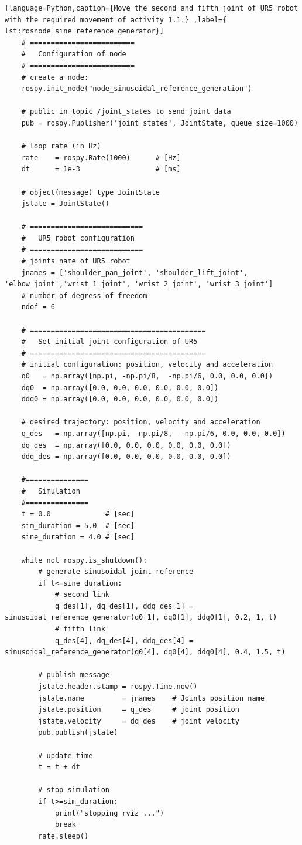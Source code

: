 \begin{lstlisting}[language=Python,caption={Move the second and fifth joint of UR5 robot with the required movement of activity 1.1.} ,label={ lst:rosnode_sine_reference_generator}]
    # =========================
    #   Configuration of node
    # =========================
    # create a node: 
    rospy.init_node("node_sinusoidal_reference_generation")
    
    # public in topic /joint_states	to send joint data	
    pub = rospy.Publisher('joint_states', JointState, queue_size=1000)
    
    # loop rate (in Hz)
    rate 	= rospy.Rate(1000)		# [Hz]
    dt 		= 1e-3					# [ms]
    
    # object(message) type JointState
    jstate = JointState()
    
    # ===========================
    #   UR5 robot configuration
    # ===========================
    # joints name of UR5 robot
    jnames = ['shoulder_pan_joint', 'shoulder_lift_joint', 'elbow_joint','wrist_1_joint', 'wrist_2_joint', 'wrist_3_joint']
    # number of degress of freedom
    ndof = 6
    
    # ==========================================
    #   Set initial joint configuration of UR5
    # ==========================================
    # initial configuration: position, velocity and acceleration 
    q0   = np.array([np.pi, -np.pi/8,  -np.pi/6, 0.0, 0.0, 0.0])
    dq0  = np.array([0.0, 0.0, 0.0, 0.0, 0.0, 0.0])
    ddq0 = np.array([0.0, 0.0, 0.0, 0.0, 0.0, 0.0]) 
    
    # desired trajectory: position, velocity and acceleration
    q_des   = np.array([np.pi, -np.pi/8,  -np.pi/6, 0.0, 0.0, 0.0]) 
    dq_des  = np.array([0.0, 0.0, 0.0, 0.0, 0.0, 0.0]) 
    ddq_des = np.array([0.0, 0.0, 0.0, 0.0, 0.0, 0.0]) 
    
    #===============
    #   Simulation
    #===============
    t = 0.0             # [sec] 
    sim_duration = 5.0  # [sec]
    sine_duration = 4.0 # [sec]
    
    while not rospy.is_shutdown():
        # generate sinusoidal joint reference
        if t<=sine_duration:
            # second link
            q_des[1], dq_des[1], ddq_des[1] = sinusoidal_reference_generator(q0[1], dq0[1], ddq0[1], 0.2, 1, t)
            # fifth link
            q_des[4], dq_des[4], ddq_des[4] = sinusoidal_reference_generator(q0[4], dq0[4], ddq0[4], 0.4, 1.5, t)
    
        # publish message
        jstate.header.stamp = rospy.Time.now()
        jstate.name 		= jnames    # Joints position name
        jstate.position 	= q_des     # joint position
        jstate.velocity 	= dq_des    # joint velocity
        pub.publish(jstate)
    
        # update time
        t = t + dt

        # stop simulation
        if t>=sim_duration:
            print("stopping rviz ...")
            break  
        rate.sleep()
\end{lstlisting}


